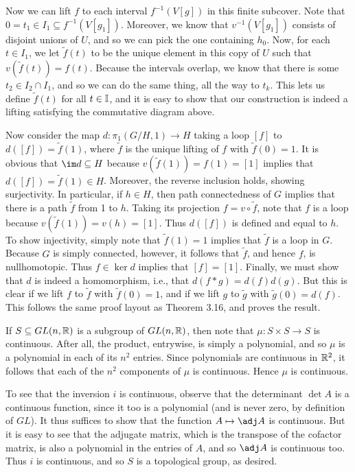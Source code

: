 \documentclass[../../solutions.tex]{subfiles}
\begin{document}
\begin{exercise}
Now we can lift $f$ to each interval $f^{-1}(V[g])$ in this finite subcover. 
Note that $0=t_1\in I_1\subseteq f^{-1}(V[g_1])$. 
Moreover, we know that $v^{-1}(V[g_1])$ consists of disjoint unions of $U$, and so we can pick the one containing $h_0$. 
Now, for each $t\in I_1$, we let $\tilde f(t)$ to be the unique element in this copy of $U$ such that $v(\tilde f(t))=f(t)$. 
Because the intervals overlap, we know that there is some $t_2\in I_2\cap I_1$, and so we can do the same thing, all the way to $t_k$. 
This lets us define $\tilde f(t)$ for all $t\in\mathbb I$, and it is easy to show that our construction is indeed a lifting satisfying the commutative diagram above. 

Now consider the map $d:\pi_1(G/H,1)\to H$ taking a loop $[f]$ to $d([f])=\tilde f(1)$, where $\tilde f$ is the unique lifting of $f$ with $\tilde f(0)=1$. 
It is obvious that $\im d\subseteq H$ because $v(\tilde f(1))=f(1)=[1]$ implies that $d([f])=\tilde f(1)\in H$. 
Moreover, the reverse inclusion holds, showing surjectivity. 
In particular, if $h\in H$, then path connectedness of $G$ implies that there is a path $\tilde f$ from 1 to $h$. 
Taking its projection $f=v\circ\tilde f$, note that $f$ is a loop because $v(\tilde f(1))=v(h)=[1]$. 
Thus $d([f])$ is defined and equal to $h$. 
To show injectivity, simply note that $\tilde f(1)=1$ implies that $\tilde f$ is a loop in $G$. 
Because $G$ is simply connected, however, it follows that $\tilde f$, and hence $f$, is nullhomotopic. 
Thus $f\in\ker d$ implies that $[f]=[1]$. 
Finally, we must show that $d$ is indeed a homomorphism, i.e., that $d(f*g)=d(f)d(g)$. 
But this is clear if we lift $f$ to $\tilde f$ with $\tilde f(0)=1$, and if we lift $g$ to $\tilde g$ with $\tilde g(0)=d(f)$. 
This follows the same proof layout as Theorem 3.16, and proves the result. 
\end{exercise}

\begin{exercise} \leavevmode
If $S\subseteq GL(n,\mathbb{R})$ is a subgroup of $GL(n,\mathbb{R})$, then note that $\mu:S\times S\to S$ is continuous. 
After all, the product, entrywise, is simply a polynomial, and so $\mu$ is a polynomial in each of its $n^2$ entries. 
Since polynomials are continuous in $\mathbb{R}^2$, it follows that each of the $n^2$ components of $\mu$ is continuous. 
Hence $\mu$ is continuous. 

To see that the inversion $i$ is continuous, observe that the determinant $\det A$ is a continuous function, since it too is a polynomial (and is never zero, by definition of $GL$). 
It thus suffices to show that the function $A\mapsto\adj A$ is continuous. 
But it is easy to see that the adjugate matrix, which is the transpose of the cofactor matrix, is also a polynomial in the entries of $A$, and so $\adj A$ is continuous too. 
Thus $i$ is continuous, and so $S$ is a topological group, as desired. 
\end{exercise}
\end{document}
